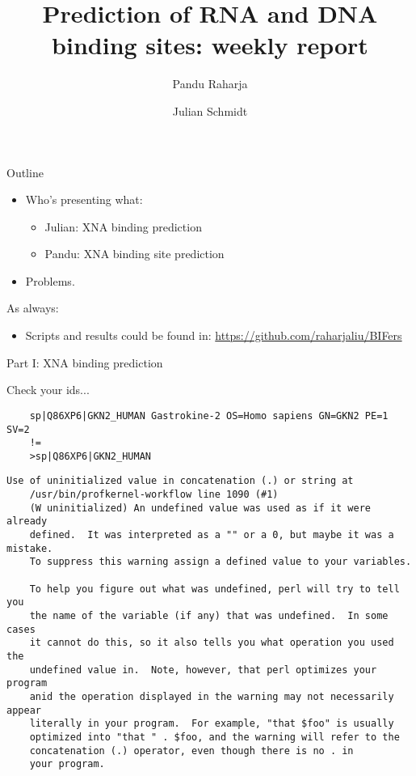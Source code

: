 \documentclass[pdf]
{beamer}
\title{Prediction of RNA and DNA binding sites: weekly report}
\subtitle{}
\author[shortname]{Pandu Raharja \inst{1, 2} \and Julian Schmidt \inst{1, 2}}
\institute[shortinst]{\inst{1} Technische Universit\"at M\"unchen \and %
                      \inst{2} Ludwig-Maximilians-Universit\"at M\"unchen}
\begin{document}
\begin{frame}
\titlepage
\end{frame}

\begin{frame}{Outline}
	\begin{itemize}
		\item Who's presenting what:
		\begin{itemize}
			\item Julian: XNA binding prediction
			\item Pandu: XNA binding site prediction
		\end{itemize}
		\item Problems.  
	\end{itemize}
\end{frame}

\begin{frame}{As always:}
	\begin{itemize}
		\item Scripts and results could be found in:
		\href{https://github.com/raharjaliu/BIFers}{https://github.com/raharjaliu/BIFers}
	\end{itemize}
\end{frame}

\begin{frame}
	\begin{center}
		\Large Part I: XNA binding prediction
	\end{center}
\end{frame}

\begin{frame}[fragile]
	\begin{center}
	\large Check your ids...
	\begin{small}
	\begin{verbatim}
	sp|Q86XP6|GKN2_HUMAN Gastrokine-2 OS=Homo sapiens GN=GKN2 PE=1 SV=2
	!=
	>sp|Q86XP6|GKN2_HUMAN
	\end{verbatim}
	\end{small}
	\begin{tiny}
		\begin{verbatim}
Use of uninitialized value in concatenation (.) or string at
	/usr/bin/profkernel-workflow line 1090 (#1)
    (W uninitialized) An undefined value was used as if it were already
    defined.  It was interpreted as a "" or a 0, but maybe it was a mistake.
    To suppress this warning assign a defined value to your variables.
    
    To help you figure out what was undefined, perl will try to tell you
    the name of the variable (if any) that was undefined.  In some cases
    it cannot do this, so it also tells you what operation you used the
    undefined value in.  Note, however, that perl optimizes your program
    anid the operation displayed in the warning may not necessarily appear
    literally in your program.  For example, "that $foo" is usually
    optimized into "that " . $foo, and the warning will refer to the
    concatenation (.) operator, even though there is no . in
    your program.
		\end{verbatim}
		\end{tiny}
	\end{center}
\end{frame}
\end{document}
